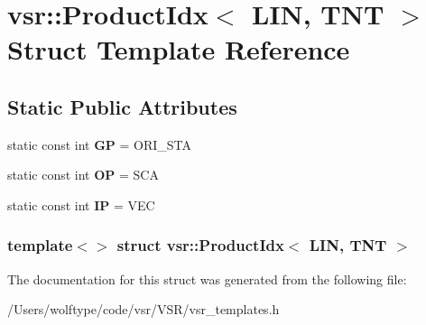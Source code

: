 \hypertarget{structvsr_1_1_product_idx_3_01_l_i_n_00_01_t_n_t_01_4}{\section{vsr\-:\-:Product\-Idx$<$ L\-I\-N, T\-N\-T $>$ Struct Template Reference}
\label{structvsr_1_1_product_idx_3_01_l_i_n_00_01_t_n_t_01_4}
}
\subsection*{Static Public Attributes}
\begin{DoxyCompactItemize}
\item 
\hypertarget{structvsr_1_1_product_idx_3_01_l_i_n_00_01_t_n_t_01_4_aa104bdc30b9d27631c947504a877350a}{static const int {\bfseries G\-P} = O\-R\-I\-\_\-\-S\-T\-A}\label{structvsr_1_1_product_idx_3_01_l_i_n_00_01_t_n_t_01_4_aa104bdc30b9d27631c947504a877350a}

\item 
\hypertarget{structvsr_1_1_product_idx_3_01_l_i_n_00_01_t_n_t_01_4_a32a41c13be9026e4ece06e847230bb3e}{static const int {\bfseries O\-P} = S\-C\-A}\label{structvsr_1_1_product_idx_3_01_l_i_n_00_01_t_n_t_01_4_a32a41c13be9026e4ece06e847230bb3e}

\item 
\hypertarget{structvsr_1_1_product_idx_3_01_l_i_n_00_01_t_n_t_01_4_aad9bca32cbe698aad2b95e37114bc854}{static const int {\bfseries I\-P} = V\-E\-C}\label{structvsr_1_1_product_idx_3_01_l_i_n_00_01_t_n_t_01_4_aad9bca32cbe698aad2b95e37114bc854}

\end{DoxyCompactItemize}
\subsubsection*{template$<$$>$ struct vsr\-::\-Product\-Idx$<$ L\-I\-N, T\-N\-T $>$}



The documentation for this struct was generated from the following file\-:\begin{DoxyCompactItemize}
\item 
/\-Users/wolftype/code/vsr/\-V\-S\-R/vsr\-\_\-templates.\-h\end{DoxyCompactItemize}
